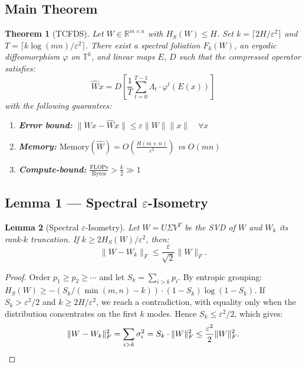 \documentclass[11pt,a4paper]{article}
\newtheorem{theorem}{Theorem}
\newtheorem{lemma}[theorem]{Lemma}
\begin{document}
\subsection{Main Theorem}

\begin{theorem}[TCFDS]\label{thm:tcfds}
Let $W \in \mathbb{R}^{m \times n}$ with $H_S(W) \leq H$. Set $k = \lceil 2H/\varepsilon^2 \rceil$ and $T = \lceil k \log(mn)/\varepsilon^2 \rceil$. There exist a spectral foliation $F_k(W)$, an ergodic diffeomorphism $\varphi$ on $\mathbb{T}^k$, and linear maps $E$, $D$ such that the compressed operator satisfies:
\begin{equation}
    \hat{W}x = D\!\left[\frac{1}{T}\sum_{t=0}^{T-1} \Lambda_t \cdot \varphi^t(E(x))\right]
\end{equation}
with the following guarantees:
\begin{enumerate}
    \item[\textnormal{(i)}] \textbf{Error bound:} $\|Wx - \hat{W}x\| \leq \varepsilon \|W\| \|x\| \quad \forall x$
    \item[\textnormal{(ii)}] \textbf{Memory:} $\mathrm{Memory}(\hat{W}) = O\!\left(\frac{H(m+n)}{\varepsilon^2}\right)$ vs $O(mn)$
    \item[\textnormal{(iii)}] \textbf{Compute-bound:} $\frac{\mathrm{FLOPs}}{\mathrm{Bytes}} > \frac{k}{2} \gg 1$
\end{enumerate}
\end{theorem}

\subsection{Lemma 1 --- Spectral $\varepsilon$-Isometry}

\begin{lemma}[Spectral $\varepsilon$-Isometry]\label{lem:isometry}
Let $W = U \Sigma V^T$ be the SVD of $W$ and $W_k$ its rank-$k$ truncation. If $k \geq 2H_S(W)/\varepsilon^2$, then:
\begin{equation}
    \|W - W_k\|_F \leq \frac{\varepsilon}{\sqrt{2}} \|W\|_F.
\end{equation}
\end{lemma}

\begin{proof}
Order $p_1 \geq p_2 \geq \cdots$ and let $S_k = \sum_{i>k} p_i$. By entropic grouping: $H_S(W) \geq -(S_k/({\min(m,n)-k})) \cdot (1-S_k)\log(1-S_k)$. If $S_k > \varepsilon^2/2$ and $k \geq 2H/\varepsilon^2$, we reach a contradiction, with equality only when the distribution concentrates on the first $k$ modes. Hence $S_k \leq \varepsilon^2/2$, which gives:
\begin{equation}
    \|W - W_k\|_F^2 = \sum_{i>k} \sigma_i^2 = S_k \cdot \|W\|_F^2 \leq \frac{\varepsilon^2}{2} \|W\|_F^2. \qedhere
\end{equation}
\end{proof}
\end{document}
